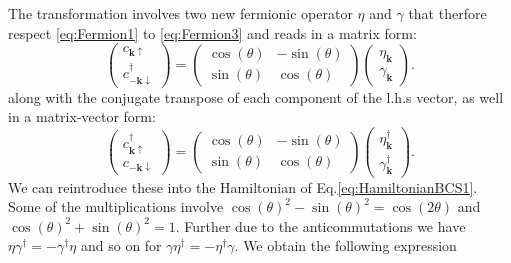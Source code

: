 \documentclass[../main.tex]{subfile}
\begin{document}
The transformation involves two new fermionic operator $\eta$ and $\gamma$ that therfore respect \ref{eq:Fermion1} to \ref{eq:Fermion3} and reads in a matrix form:
\begin{equation}\label{eq:RotationBasis_c1}
    \begin{pmatrix}
        c_{\bm{k}\uparrow}\\
        c_{-\bm{k}\downarrow}^{\dagger}
    \end{pmatrix} = 
    \begin{pmatrix}
        \cos(\theta) & -\sin(\theta)\\
        \sin(\theta) & \cos(\theta)
    \end{pmatrix}
    \begin{pmatrix}
        \eta_{\bm{k}}\\
        \gamma_{\bm{k}}
    \end{pmatrix}.
\end{equation}
along with the conjugate transpose of each component of the l.h.s vector, as well in a matrix-vector form:
\begin{equation}\label{eq:RotationBasis_c2}
    \begin{pmatrix}
        c_{\bm{k}\uparrow}^{\dagger} \\
        c_{-\bm{k}\downarrow}
    \end{pmatrix} = 
    \begin{pmatrix}
        \cos(\theta) & -\sin(\theta)\\
        \sin(\theta) & \cos(\theta)
    \end{pmatrix}
    \begin{pmatrix}
        \eta_{\bm{k}}^{\dagger} \\
        \gamma_{\bm{k}}^{\dagger}
    \end{pmatrix}.
\end{equation}
We can reintroduce these into the Hamiltonian of Eq.\ref{eq:HamiltonianBCS1}. 
Some of the multiplications involve $\cos(\theta)^2 - \sin(\theta)^2 = \cos(2\theta)$ and $\cos(\theta)^2 + \sin(\theta)^2 = 1$. 
Further due to the anticommutations we have $\eta \gamma^{\dagger} = - \gamma^{\dagger}\eta$ and so on for $\gamma \eta^{\dagger} = - \eta^{\dagger}\gamma$.
We obtain the following expression
\end{document}
